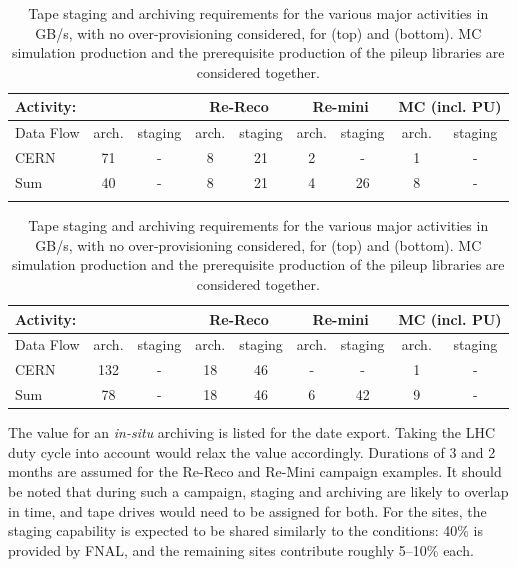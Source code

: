 
\begin{table}[tbph]
	\centering
	\caption{Tape staging and archiving requirements for the various major activities in GB/s, with no over-provisioning considered, for \RunFour (top) and \RunFive (bottom). \gls{MC} simulation production and the prerequisite production of the pileup libraries are considered together.}
	\begin{tabular}{|l|c|c|c|c|c|c|c|c|}
	\hline
	\rowcolor{tableheader}  Activity: & \multicolumn{2}{c|}{\TierZero}  & \multicolumn{2}{c|}{Re-Reco} 
	                                & \multicolumn{2}{c|}{Re-mini} & \multicolumn{2}{c|}{MC (incl. PU)} \\ \hline
	\rowcolor{tableheader}  Data Flow        & arch. & staging & arch. & staging & arch. & staging & arch. & staging \\ \hline    
	\cellcolor{tablerowheader}  CERN         & 71    & -       &  8    &  21     & 2     &  -      & 1     &  - \\ \hline
	\cellcolor{tablerowheader}  Sum \TierOne & 40    & -       &  8    &  21     & 4     &  26     & 8     &  - \\ \hline
	\multicolumn{9}{c}{}\\
	\end{tabular}
	\begin{tabular}{|l|c|c|c|c|c|c|c|c|}
	\hline
	\rowcolor{tableheader}  Activity: & \multicolumn{2}{c|}{\TierZero}  & \multicolumn{2}{c|}{Re-Reco} 
	                                & \multicolumn{2}{c|}{Re-mini} & \multicolumn{2}{c|}{MC (incl. PU)} \\ \hline
	\rowcolor{tableheader}  Data Flow        & arch. & staging & arch. & staging & arch. & staging & arch. & staging \\ \hline    
	\cellcolor{tablerowheader}  CERN         & 132   & -       &  18   &  46     & -     &  -      &  1    &  - \\ \hline
	\cellcolor{tablerowheader}  Sum \TierOne &  78   & -       &  18   &  46     & 6     &  42     & 9     &  - \\ \hline
	\end{tabular}
	\label{tab:staging-r4_r5}
\end{table}

 The value for an \textit{in-situ} archiving is listed for the \TierZero date export. Taking the LHC duty cycle into account would relax the value accordingly. Durations of 3 and 2 months are assumed for the Re-Reco and Re-Mini campaign examples. It should be noted that during such a campaign, staging and archiving are likely to overlap in time, and tape drives would need to be assigned for both. For the \TierOne sites, the staging capability is expected to be shared similarly to the \RunThree conditions: 40\% is provided by \gls{FNAL}, and the remaining sites contribute roughly 5--10\% each.


